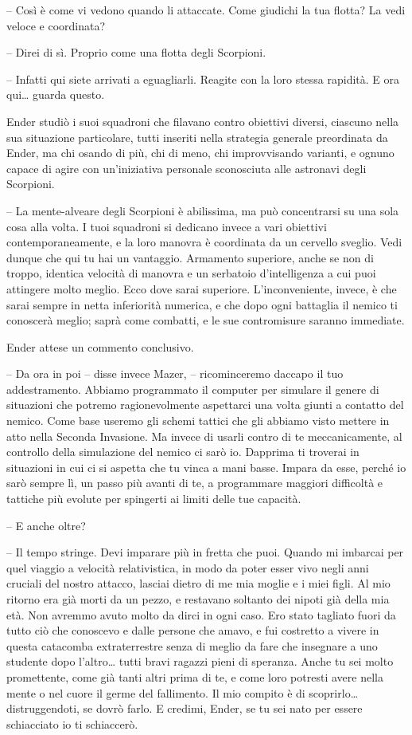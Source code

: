 {-- Così è come vi vedono quando li attaccate. Come giudichi la tua
	flotta? La vedi veloce e coordinata?}

{-- Direi di sì. Proprio come una flotta degli Scorpioni.}

{-- Infatti qui siete arrivati a eguagliarli. Reagite con la loro stessa
	rapidità. E ora qui\ldots{} guarda questo.}

{Ender studiò i suoi squadroni che filavano contro obiettivi diversi,
	ciascuno nella sua situazione particolare, tutti inseriti nella
	strategia generale preordinata da Ender, ma chi osando di più, chi di
	meno, chi improvvisando varianti, e ognuno capace di agire con
	un'iniziativa personale sconosciuta alle astronavi degli Scorpioni.}

{-- La mente-alveare degli Scorpioni è abilissima, ma può concentrarsi
	su una sola cosa alla volta. I tuoi squadroni si dedicano invece a vari
	obiettivi contemporaneamente, e la loro manovra è coordinata da un
	cervello sveglio. Vedi dunque che qui tu hai un vantaggio. Armamento
	superiore, anche se non di troppo, identica velocità di manovra e un
	serbatoio d'intelligenza a cui puoi attingere molto meglio. Ecco dove
	sarai superiore. L'inconveniente, invece, è che sarai sempre in netta
	inferiorità numerica, e che dopo ogni battaglia il nemico ti conoscerà
	meglio; saprà come combatti, e le sue contromisure saranno immediate.}

{Ender attese un commento conclusivo.}

{-- Da ora in poi -- disse invece Mazer, -- ricominceremo daccapo il tuo
	addestramento. Abbiamo programmato il computer per simulare il genere di
	situazioni che potremo ragionevolmente aspettarci una volta giunti a
	contatto del nemico. Come base useremo gli schemi tattici che gli
	abbiamo visto mettere in atto nella Seconda Invasione. Ma invece di
	usarli contro di te meccanicamente, al controllo della simulazione del
	nemico ci sarò io. Dapprima ti troverai in situazioni in cui ci si
	aspetta che tu vinca a mani basse. Impara da esse, perché io sarò sempre
	lì, un passo più avanti di te, a programmare maggiori difficoltà e
	tattiche più evolute per spingerti ai limiti delle tue capacità.}

{-- E anche oltre?}

{-- Il tempo stringe. Devi imparare più in fretta che puoi. Quando mi
	imbarcai per quel viaggio a velocità relativistica, in modo da poter
	esser vivo negli anni cruciali del nostro attacco, lasciai dietro di me
	mia moglie e i miei figli. Al mio ritorno era già morti da un pezzo, e
	restavano soltanto dei nipoti già della mia età. Non avremmo avuto molto
	da dirci in ogni caso. Ero stato tagliato fuori da tutto ciò che
	conoscevo e dalle persone che amavo, e fui costretto a vivere in questa
	catacomba extraterrestre senza di meglio da fare che insegnare a uno
	studente dopo l'altro\ldots{} tutti bravi ragazzi pieni di speranza.
	Anche tu sei molto promettente, come già tanti altri prima di te, e come
	loro potresti avere nella mente o nel cuore il germe del fallimento. Il
	mio compito è di scoprirlo\ldots{} distruggendoti, se dovrò farlo. E
	credimi, Ender, se tu sei nato per essere schiacciato io ti schiaccerò.}

